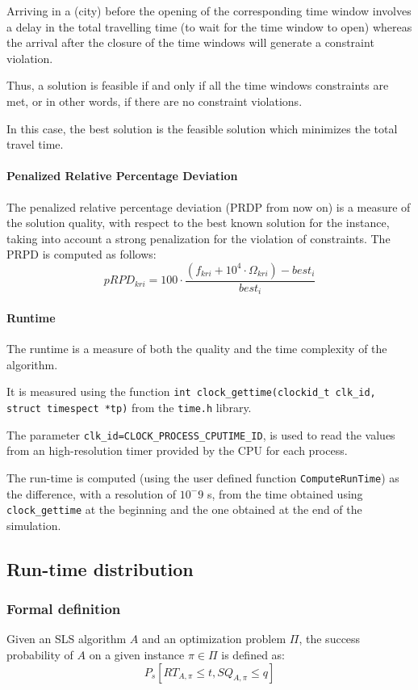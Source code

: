 Arriving in a (city) before the opening of the corresponding time window involves a delay in the total travelling time (to wait for the time window to open) whereas the arrival after the closure of the time windows will generate a constraint violation.

Thus, a solution is feasible if and only if all the time windows constraints are met, or in other words, if there are no constraint violations.

In this case, the best solution is the feasible solution which minimizes the total travel time.

\paragraph{Penalized Relative Percentage Deviation}
The penalized relative percentage deviation (PRDP from now on) is a measure of the solution quality, with respect to the best known solution for the instance, taking into account a strong penalization for the violation of constraints.
The PRPD is computed as follows:
\begin{equation}
pRPD_{kri} = 100 \cdot \frac{(f_{kri} + 10^4\cdot\Omega_{kri})-best_i}{best_i}
\end{equation}

\paragraph{Runtime}
The runtime is a measure of both the quality and the time complexity of the algorithm.

It is measured using the function \verb|int clock_gettime(clockid_t clk_id, struct timespect *tp)| from the \verb|time.h| library.

The parameter \verb|clk_id=CLOCK_PROCESS_CPUTIME_ID|, is used to read the values from an high-resolution timer provided by the CPU for each process.

The run-time is computed (using the user defined function \verb|ComputeRunTime|) as the difference, with a resolution of $10^-9$ s, from the time obtained using \verb|clock_gettime| at the beginning and the one obtained at the end of the simulation.


\subsection{Run-time distribution}
\subsubsection{Formal definition}
Given an SLS algorithm $A$ and an optimization problem $\Pi$, the success probability of $A$ on a given instance $\pi \in \Pi$ is defined as: 
\begin{equation}
  P_s[RT_{A,\pi} \le t,SQ_{A,\pi} \le q]
\end{equation}

